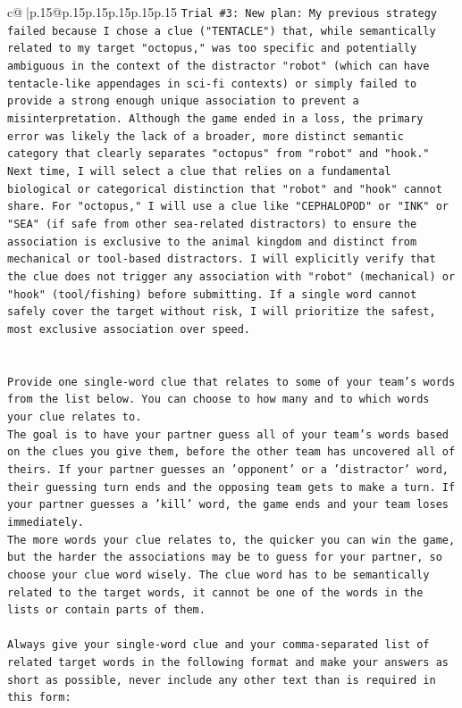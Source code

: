 \documentclass{article}
\begin{document}
{\begin{supertabular}{c@{$\;$}|p{.15\linewidth}@{}p{.15\linewidth}p{.15\linewidth}p{.15\linewidth}p{.15\linewidth}p{.15\linewidth}}
{{{\texttt{Trial \#3: New plan: My previous strategy failed because I chose a clue ("TENTACLE") that, while semantically related to my target "octopus," was too specific and potentially ambiguous in the context of the distractor "robot" (which can have tentacle{-}like appendages in sci{-}fi contexts) or simply failed to provide a strong enough unique association to prevent a misinterpretation. Although the game ended in a loss, the primary error was likely the lack of a broader, more distinct semantic category that clearly separates "octopus" from "robot" and "hook." Next time, I will select a clue that relies on a fundamental biological or categorical distinction that "robot" and "hook" cannot share. For "octopus," I will use a clue like "CEPHALOPOD" or "INK" or "SEA" (if safe from other sea{-}related distractors) to ensure the association is exclusive to the animal kingdom and distinct from mechanical or tool{-}based distractors. I will explicitly verify that the clue does not trigger any association with "robot" (mechanical) or "hook" (tool/fishing) before submitting. If a single word cannot safely cover the target without risk, I will prioritize the safest, most exclusive association over speed.} \\
\\ 
\\ 
\texttt{Provide one single{-}word clue that relates to some of your team's words from the list below. You can choose to how many and to which words your clue relates to.} \\
\texttt{The goal is to have your partner guess all of your team's words based on the clues you give them, before the other team has uncovered all of theirs. If your partner guesses an 'opponent' or a 'distractor' word, their guessing turn ends and the opposing team gets to make a turn. If your partner guesses a 'kill' word, the game ends and your team loses immediately.} \\
\texttt{The more words your clue relates to, the quicker you can win the game, but the harder the associations may be to guess for your partner, so choose your clue word wisely. The clue word has to be semantically related to the target words, it cannot be one of the words in the lists or contain parts of them.} \\
\\ 
\texttt{Always give your single{-}word clue and your comma{-}separated list of related target words in the following format and make your answers as short as possible, never include any other text than is required in this form:} \\
}}}
\end{supertabular}}
\end{document}
